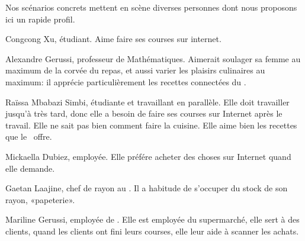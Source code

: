 Nos scénarios concrets mettent en scène diverses personnes dont nous proposons ici un rapide profil.
\blank[big]

Congcong Xu, étudiant.\crlf
Aime faire ses courses sur internet.
\stopfiguretext

Alexandre Gerussi, professeur de Mathématiques.\crlf
Aimerait soulager sa femme au maximum de la corvée du repas, et aussi varier les plaisirs culinaires au maximum: il apprécie particulièrement les recettes connectées du \fm.
\stopfiguretext

Raïssa Mbabazi Simbi, étudiante et travaillant en parallèle.\crlf
Elle doit travailler jusqu'à très tard, donc elle a besoin de faire ses courses sur Internet après le travail. 
Elle ne sait pas bien comment faire la cuisine.
Elle aime bien les recettes que le \fm\ offre.
\stopfiguretext

Mickaella Dubiez, employée.\crlf
Elle préfére acheter des choses sur Internet quand elle demande.
\stopfiguretext

Gaetan Laajine, chef de rayon au \fm.\crlf
Il a habitude de s'occuper du stock de son rayon, «papeterie».
\stopfiguretext

Mariline Gerussi, employée de \fm.\crlf
Elle est employée du supermarché, elle sert à des clients, quand les clients ont fini leurs courses, elle leur aide à scanner les achats.
\stopfiguretext
